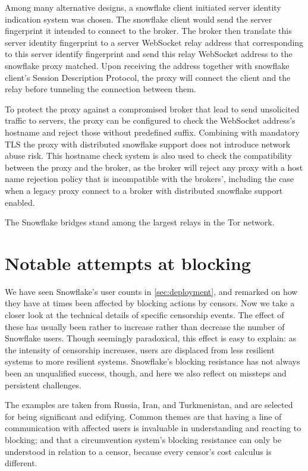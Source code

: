 \documentclass[letterpaper,twocolumn]{article}
\begin{document}
Among many alternative designs, a snowflake client initiated server identity indication system was chosen. The snowflake client would send the server fingerprint it intended to connect to the broker. The broker then translate this server identity fingerprint to a server WebSocket relay address that corresponding to this server identify fingerprint and send this relay WebSocket address to the snowflake proxy matched. Upon receiving the address together with snowflake client's Session Description Protocol, the proxy will connect the client and the relay before tunneling the connection between them.

To protect the proxy against a compromised broker that lead to send unsolicited traffic to servers, the proxy can be configured to check the WebSocket address's hostname and reject those without predefined suffix. Combining with mandatory TLS the proxy with distributed snowflake support does not introduce network abuse risk. This hostname check system is also used to check the compatibility between the proxy and the broker, as the broker will reject any proxy with a host name rejection policy that is incompatible with the brokers', including the case when a legacy proxy connect to a broker with distributed snowflake support enabled.

The Snowflake bridges stand among the largest relays in the Tor network.

\section{Notable attempts at blocking}
\label{sec:block}

We have seen Snowflake's user counts in \autoref{sec:deployment},
and remarked on how they have at times been affected by blocking actions by censors.
Now we take a closer look at the technical details of specific censorship events.
The effect of these has usually been rather to increase rather than decrease
the number of Snowflake users.
Though seemingly paradoxical, this effect is easy to explain:
as the intensity of censorship increases,
users are displaced from less resilient systems
to more resilient systems.
Snowflake's blocking resistance has not always been an unqualified success,
though, and here we also reflect on missteps
and persistent challenges.

The examples are taken from
Russia, Iran, and Turkmenistan,
and are selected for being significant and edifying.
Common themes are that having a line of communication
with affected users is invaluable in understanding and reacting to blocking;
and that a circumvention system's blocking resistance
can only be understood in relation to a censor,
because every censor's cost calculus is different.
\end{document}
